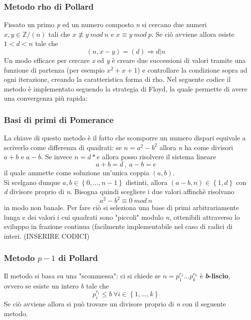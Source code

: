 \documentclass{article}
\begin{document}
	\subsubsection{Metodo rho di Pollard}
	Fissato un primo \textit{p} ed un numero composto \textit{n} si cercano due numeri \(x,y\in\mathbb{Z}/(n)\) tali che \(x\not\equiv y\ mod\ n\) e \(x\equiv y\ mod\ p\). Se ciò avviene allora esiste \(1<d<n\) tale che \[(n,x-y)=(d)\Rightarrow d|n\]
	Un modo efficace per cercare \textit{x} ed \textit{y} è creare due successioni di valori tramite una funzione di partenza (per esempio \(x^2+x+1\)) e controllare la condizione sopra ad ogni iterazione, creando la caratteristica forma di rho. Nel seguente codice il metodo è implementato seguendo la strategia di Floyd, la quale permette di avere una convergenza più rapida: 
	\vspace{1cm}
	
	\vspace{1cm}
	\subsubsection{Basi di primi di Pomerance}
	La chiave di questo metodo è il fatto che scomporre un numero dispari equivale a scriverlo come differenza di quadrati: se \(n=a^2-b^2\) allora \textit{n} ha come divisori \(a+b\) e \(a-b\). Se invece \(n=d*e\) allora posso risolvere il sistema lineare 
	\[a+b=d\ ,\ a-b=e\]
	il quale ammette come soluzione un'unica coppia \((a,b)\).\\ 
	Si scelgano dunque \(a,b\in\left\{0,...,n-1\right\}\) distinti, allora \((a-b,n)\in\left\{1,d\right\}\) con \textit{d} divisore proprio di \textit{n}.
	Bisogna quindi scegliere i due valori affinchè risolvano 
	\[a^2-b^2\equiv 0\ mod\ n \] in modo non banale.
	Per fare ciò si seleziona una base di primi arbitrariamente lunga e dei valori i cui quadrati sono "piccoli" modulo \textit{n}, ottenibili attraverso lo sviluppo in frazione continua (facilmente implementabile nel caso di radici di interi. (INSERIRE CODICI)
	\subsubsection{Metodo \(p-1\) di Pollard}
	Il metodo si basa su una "scommessa": ci si chiede se \(n=p_1^{e_1}...p_k^{e_k}\) è \textbf{\textit{b}-liscio}, ovvero se esiste un intero \textit{b} tale che \[p_i^{e_i}\le b\ \forall i\in\left\{1,...,k\right\}\]
	Se ciò avviene allora si può trovare un divisore proprio di \textit{n} con il seguente metodo.
	\vspace{1cm}
	
	\vspace{1cm}\vspace{1cm}
\end{document}
